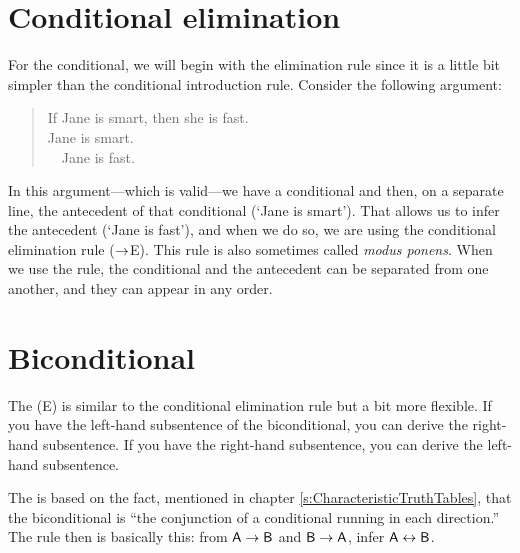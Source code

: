 \section{Conditional elimination}

For the conditional, we will begin with the elimination rule since it is a little bit simpler than the conditional introduction rule. Consider the following argument:
	\begin{quote}
		If Jane is smart, then she is fast.\\
		Jane is smart.\\ 
		\therefore~~Jane is fast.
	\end{quote}
In this argument---which is valid---we have a conditional and then, on a separate line, the antecedent of that conditional (`Jane is smart'). That allows us to infer the antecedent (`Jane is fast'), and when we do so, we are using the conditional elimination rule ($\rightarrow$E).
This rule is also sometimes called \emph{modus ponens}. When we use the rule, the conditional and the antecedent can be separated from one another, and they can appear in any order.


\section{Biconditional}

The  ({\eiff}E) is similar to the conditional elimination rule but a bit more flexible. If you have the left-hand subsentence of the biconditional, you can derive the right-hand subsentence. If you have the right-hand subsentence, you can derive the left-hand subsentence.
\factoidbox{
\begin{proof}
	\have[m]{ab}{\meta{A}\eiff\meta{B}}
	\have[n]{a}{\meta{A}}
	\have[\ ]{b}{\meta{B}} \be{ab,a}
\end{proof}
\begin{proof}
	\have[m]{ab}{\meta{A}\eiff\meta{B}}
	\have[n]{a}{\meta{B}}
	\have[\ ]{b}{\meta{A}} \be{ab,a}
\end{proof}}

The  is based on the fact, mentioned in chapter \ref{s:CharacteristicTruthTables}, that the biconditional is ``the conjunction of a conditional running in each direction.'' The rule then is basically this: from $\mathsf{A} \rightarrow \mathsf{B}$ and $\mathsf{B} \rightarrow \mathsf{A}$, infer $\mathsf{A} \leftrightarrow \mathsf{B}$.

